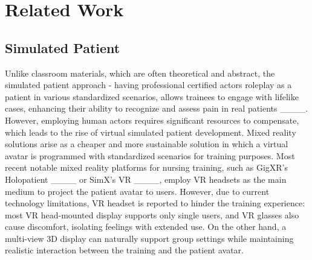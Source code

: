 \section{Related Work}
\subsection{Simulated Patient}
Unlike classroom materials, which are often theoretical and abstract, the simulated patient approach - having professional certified actors roleplay as a patient in various standardized scenarios, allows trainees to engage with lifelike cases, enhancing their ability to recognize and assess pain in real patients ____. However, employing human actors requires significant resources to compensate, which leads to the rise of virtual simulated patient development. Mixed reality solutions arise as a cheaper and more sustainable solution in which a virtual avatar is programmed with standardized scenarios for training purposes. Most recent notable mixed reality platforms for nursing training, such as GigXR's Holopatient ____ or SimX's VR ____, employ VR headsets as the main medium to project the patient avatar to users. However, due to current technology limitations, VR headset is reported to hinder the training experience: most VR head-mounted display supports only single users, and VR glasses also cause discomfort, isolating feelings with extended use. On the other hand, a multi-view 3D display can naturally support group settings while maintaining realistic interaction between the training and the patient avatar.